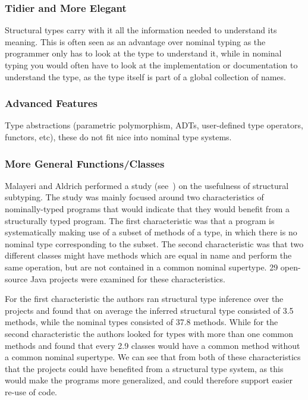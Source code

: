 \subsubsection{Tidier and More Elegant}\label{subsubsec:tidier-and-more-elegant}

Structural types carry with it all the information needed to understand its meaning.
This is often seen as an advantage over nominal typing as the programmer only has to look at the type to understand it, while in nominal typing you would often have to look at the implementation or documentation to understand the type, as the type itself is part of a global collection of names.

\subsubsection{Advanced Features}\label{subsubsec:advanced-type-features}

Type abstractions (parametric polymorphism, ADTs, user-defined type operators, functors, etc), these do not fit nice into nominal type systems.

\subsubsection{More General Functions/Classes}\label{subsubsec:more-general-functions}

Malayeri and Aldrich performed a study (see~\cite{malayeri}) on the usefulness of structural subtyping.
The study was mainly focused around two characteristics of nominally-typed programs that would indicate that they would benefit from a structurally typed program.
The first characteristic was that a program is systematically making use of a subset of methods of a type, in which there is no nominal type corresponding to the subset.
The second characteristic was that two different classes might have methods which are equal in name and perform the same operation, but are not contained in a common nominal supertype.
29 open-source Java projects were examined for these characteristics.

For the first characteristic the authors ran structural type inference over the projects and found that on average the inferred structural type consisted of 3.5 methods, while the nominal types consisted of 37.8 methods.
While for the second characteristic the authors looked for types with more than one common methods and found that every 2.9 classes would have a common method without a common nominal supertype.
We can see that from both of these characteristics that the projects could have benefited from a structural type system, as this would make the programs more generalized, and could therefore support easier re-use of code.

